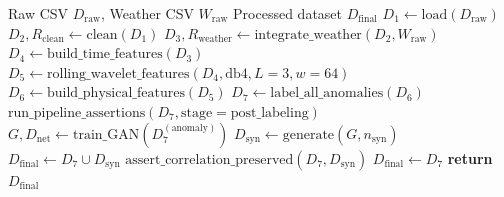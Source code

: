 \begin{algorithm}[htbp]
\caption{DS108-ELECTRIMIGHT PIPELINE}
\label{alg:pipeline}
\begin{algorithmic}[1]
\REQUIRE Raw CSV $D_{\text{raw}}$, Weather CSV $W_{\text{raw}}$
\ENSURE Processed dataset $D_{\text{final}}$
\STATE $D_1 \leftarrow \text{load}(D_{\text{raw}})$ 
\STATE $D_2, R_{\text{clean}} \leftarrow \text{clean}(D_1)$
\STATE {}
\STATE $D_3, R_{\text{weather}} \leftarrow \text{integrate\_weather}(D_2, W_{\text{raw}})$
\STATE {}
\STATE $D_4 \leftarrow \text{build\_time\_features}(D_3)$
\STATE {}
\STATE $D_5 \leftarrow \text{rolling\_wavelet\_features}(D_4, \text{db4}, L=3, w=64)$
\STATE $D_6 \leftarrow \text{build\_physical\_features}(D_5)$
\STATE {}
\STATE $D_7 \leftarrow \text{label\_all\_anomalies}(D_6)$
\STATE {}
\STATE $\text{run\_pipeline\_assertions}(D_7, \text{stage}=\text{post\_labeling})$
    \STATE $G, D_{\text{net}} \leftarrow \text{train\_GAN}(D_7^{(\text{anomaly})})$
    \STATE $D_{\text{syn}} \leftarrow \text{generate}(G, n_{\text{syn}})$
    \STATE $D_{\text{final}} \leftarrow D_7 \cup D_{\text{syn}}$
    \STATE $\text{assert\_correlation\_preserved}(D_7, D_{\text{syn}})$
\ELSE
    \STATE $D_{\text{final}} \leftarrow D_7$
\ENDIF
\STATE \textbf{return} $D_{\text{final}}$
\end{algorithmic}
\end{algorithm}

